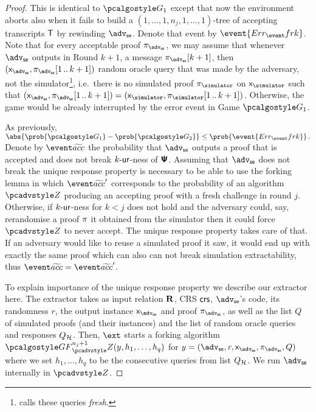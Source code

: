 \let\accentvec\vec \documentclass[runningheads]{llncs}
\begin{document}
\begin{proof}
     This is identical to $\game{1}$ except that now the environment
    aborts also when it fails to build a $(1, \ldots, 1, n_j, 1, \ldots,
    1)$-tree of accepting transcripts $\mathsf{T}$ by rewinding $\advse$. Denote that
    event by $\event{\errfrk}$. Note that for every acceptable proof
    $\zkproof_{\advse}$, we may assume that whenever $\advse$ outputs in Round
    $k + 1$, a message $\zkproof_{\advse}[k + 1]$, then $(\inp_\advse,
    \zkproof_{\advse}\range{1}{k + 1})$ random oracle query that was made by the
    adversary, not the simulator\footnote{\cite{INDOCRYPT:FKMV12} calls these
      queries \emph{fresh}.}, i.e.~there is no simulated proof
    $\zkproof_\simulator$ on $\inp_\simulator$ such that $(\inp_\advse,
    \zkproof_\advse \range{1}{k + 1}) = (\inp_\simulator, \zkproof_\simulator
    \range{1}{k + 1})$. Otherwise, the game would be already interrupted by the
    error event in Game $\game{1}$.

As previously, 
\(
	\abs{\prob{\game{1}} - \prob{\game{2}}} \leq \prob{\event{\errfrk}}\,.
	\)
Denote by $\waccProb$ the probability that $\advse$ outputs a proof that is
accepted and does not break ${k\text{-}\mathsf{ur}}$-ness of $\bm{\mathsf{\Psi}}$.
Assuming that $\advse$ does not break the unique response property is
necessary to be able to use the forking lemma in which $\waccProb'$ corresponds
to the probability of an algorithm $\zdv$ producing an accepting proof with a
fresh challenge in round $j$.
%
Otherwise, if ${k\text{-}\mathsf{ur}}$-ness for $k<j$ does not hold and the adversary
could, say, rerandomise a proof $\pi$ it obtained from the simulator then
it could force $\zdv$ to never accept.  The unique
response property takes care of that. If an adversary would like to reuse
a simulated proof it saw, it would end up with exactly the same proof
which can also can not break simulation extractability, thus $\waccProb=\waccProb'$.

To explain importance of the unique response property we describe our extractor
here. The extractor takes as input relation $\mathbf{R}$, CRS $\mathsf{crs}$, $\advse$'s code,
its randomness $r$, the output instance $\inp_\advse$ and proof
$\zkproof_\advse$, as well as the list $Q$ of simulated proofs (and their
instances) and the list of random oracle queries and responses $Q_{\mathcal{H}}$. Then,
$\ext$ starts a forking algorithm $\genforking^{n_j + 1}_\zdv(y,h_1, \ldots,
h_q)$ for $y = (\advse, r, \inp_\advse, \zkproof_\advse, Q)$ where we set $h_1,
\ldots, h_q$ to be the consecutive queries from list $Q_{\mathcal{H}}$. We run $\advse$
internally in $\zdv$.


\end{proof}
\end{document}

